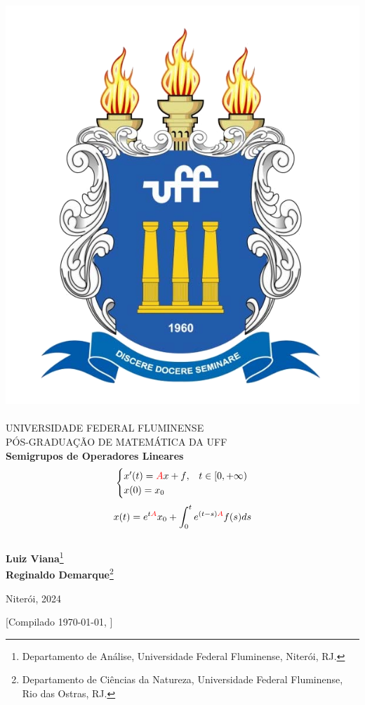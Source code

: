 \documentclass[12pt]{book}
\theoremstyle{definition}
\theoremstyle{remark}
\numberwithin{section}{chapter}
\numberwithin{equation}{chapter}
\begin{document}
\begin{titlepage}
\begin{center}
\includegraphics[scale=0.15]{brasao-cor.png}~\\
UNIVERSIDADE FEDERAL FLUMINENSE \\
PÓS-GRADUAÇÃO DE MATEMÁTICA DA UFF\\[4cm]
{\Huge \textbf{Semigrupos de Operadores Lineares}}\\
{\Large
\begin{equation*}
\begin{cases}
x'(t)={\color{red}A}x+{\color{black}f},& t\in [0,+\infty)\\
x(0)=x_0
\end{cases}
\end{equation*}
\begin{equation*}
x(t)=e^{t\color{red}A}x_0+\int_0^t e^{(t-s){\color{red}A}}f(s)ds
\end{equation*}}\\[1cm]
\textbf{Luiz Viana}\footnote{Departamento de Análise, Universidade Federal Fluminense, Niterói, RJ.}\\
\textbf{Reginaldo Demarque}\footnote{Departamento de Ciências da Natureza, Universidade Federal Fluminense, Rio das Ostras, RJ.}\\
\vfill

{\large Niterói, 2024}

[Compilado \today, \currenttime] 
\par
\end{center}
\end{titlepage}
\end{document}
